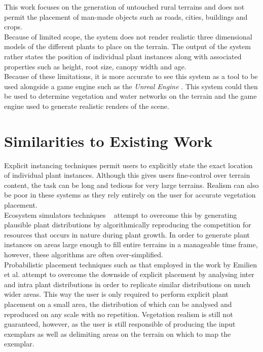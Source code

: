This work focuses on the generation of untouched rural terrains and does not permit the placement of man-made objects such as roads, cities, buildings and crops. \\

Because of limited scope, the system does not render realistic three dimensional models of the different plants to place on the terrain. The output of the system rather states the position of individual plant instances along with associated properties such as height, root size, canopy width and age.\\

Because of these limitations, it is more accurate to see this system as a tool to be used alongside a game engine such as the \textit{Unreal Engine} \protect\footnotemark {}. This system could then be used to determine vegetation and water networks on the terrain and the game engine used to generate realistic renders of the scene.

\section{Similarities to Existing Work}

Explicit instancing techniques \cite{Emilien,Deussen1998,Andujar2014} permit users to explicitly state the exact location of individual plant instances. Although this gives users fine-control over terrain content, the task can be long and tedious for very large terrains. Realism can also be poor in these systems as they rely entirely on the user for accurate vegetation placement.\\
Ecosystem simulators techniques ~\cite{Lane2002,Deussen1998} attempt to overcome this by generating plausible plant distributions by algorithmically reproducing the competition for resources that occurs in nature during plant growth. In order to generate plant instances on areas large enough to fill entire terrains in a manageable time frame, however, these algorithms are often over-simplified.\\
Probabilistic placement techniques such as that employed in the work by Emilien et al. \cite{Emilien} attempt to overcome the downside of explicit placement by analysing inter and intra plant distributions in order to replicate similar distributions on much wider areas. This way the user is only required to perform explicit plant placement on a small area, the distribution of which can be analysed and reproduced on any scale with no repetition. Vegetation realism is still not guaranteed, however, as the user is still responsible of producing the input exemplars as well as delimiting areas on the terrain on which to map the exemplar.\\

